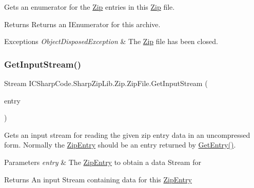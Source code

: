 Gets an enumerator for the \hyperlink{namespace_i_c_sharp_code_1_1_sharp_zip_lib_1_1_zip}{Zip} entries in this \hyperlink{namespace_i_c_sharp_code_1_1_sharp_zip_lib_1_1_zip}{Zip} file. 

\begin{DoxyReturn}{Returns}
Returns an I\+Enumerator for this archive.
\end{DoxyReturn}

\begin{DoxyExceptions}{Exceptions}
{\em Object\+Disposed\+Exception} & The \hyperlink{namespace_i_c_sharp_code_1_1_sharp_zip_lib_1_1_zip}{Zip} file has been closed. \\
\hline
\end{DoxyExceptions}
\mbox{\label{class_i_c_sharp_code_1_1_sharp_zip_lib_1_1_zip_1_1_zip_file_a20e0fae7497b2540dbcedc5c27a0d772}} 
\subsubsection{\texorpdfstring{Get\+Input\+Stream()}{GetInputStream()}\hspace{0.1cm}{\footnotesize\ttfamily [1/2]}}
{\footnotesize\ttfamily Stream I\+C\+Sharp\+Code.\+Sharp\+Zip\+Lib.\+Zip.\+Zip\+File.\+Get\+Input\+Stream (\begin{DoxyParamCaption}\item[{\hyperlink{class_i_c_sharp_code_1_1_sharp_zip_lib_1_1_zip_1_1_zip_entry}{Zip\+Entry}}]{entry }\end{DoxyParamCaption})\hspace{0.3cm}{\ttfamily [inline]}}



Gets an input stream for reading the given zip entry data in an uncompressed form. Normally the \hyperlink{class_i_c_sharp_code_1_1_sharp_zip_lib_1_1_zip_1_1_zip_entry}{Zip\+Entry} should be an entry returned by \hyperlink{class_i_c_sharp_code_1_1_sharp_zip_lib_1_1_zip_1_1_zip_file_a1d49a515fa629d36f64736581d84e3d8}{Get\+Entry()}. 


\begin{DoxyParams}{Parameters}
{\em entry} & The \hyperlink{class_i_c_sharp_code_1_1_sharp_zip_lib_1_1_zip_1_1_zip_entry}{Zip\+Entry} to obtain a data Stream for\\
\hline
\end{DoxyParams}
\begin{DoxyReturn}{Returns}
An input Stream containing data for this \hyperlink{class_i_c_sharp_code_1_1_sharp_zip_lib_1_1_zip_1_1_zip_entry}{Zip\+Entry}
\end{DoxyReturn}

